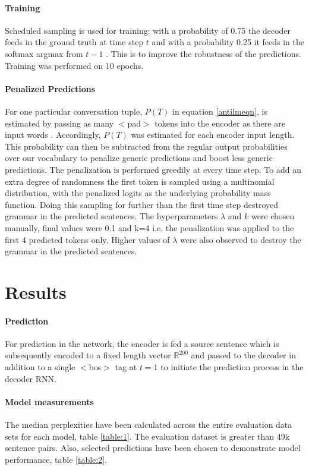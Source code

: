 \documentclass[%
 reprint,
 amsmath,amssymb,
 aps,
]{revtex4-1}
\begin{document}
\paragraph{Training} Scheduled sampling is used for training: with a probability of 0.75 the decoder feeds in the ground truth at time step $t$ and with a probability 0.25 it feeds in the softmax argmax from $t-1$ \cite{ss}. This is to improve the robustness of the predictions. Training was performed on 10 epochs.

\paragraph{Penalized Predictions}
For one particular conversation tuple, $P(T)$ in equation \ref{antilmeqn}, is estimated by passing as many $<$pad$>$ tokens into the encoder as there are input words \cite{antilmgithub}. Accordingly, $P(T)$ was estimated for each encoder input length. This probability can then be subtracted from the regular output probabilities over our vocabulary to penalize generic predictions and boost less generic predictions. The penalization is performed greedily at every time step. To add an extra degree of randomness the first token is sampled using a multinomial distribution, with the penalized logits as the underlying probability mass function. Doing this sampling for further than the first time step destroyed grammar in the predicted sentences. The hyperparameters $\lambda$ and $k$ were chosen manually, final values were 0.1 and k=4 i.e. the penalization was applied to the first 4 predicted tokens only. Higher values of $\lambda$ were also observed to destroy the grammar in the predicted sentences.

\section{\label{sec:level1}Results} \label{results}

\paragraph{Prediction}
For prediction in the network, the encoder is fed a source sentence which is subsequently encoded to a fixed length vector $\mathbb{R}^{200}$ and passed to the decoder in addition to a single $<$bos$>$ tag at $t=1$ to initiate the prediction process in the decoder RNN.

\paragraph{Model measurements}
The median perplexities have been calculated across the entire evaluation data sets for each model, table \ref{table:1}. The evaluation dataset is greater than 49k sentence pairs. Also, selected predictions have been chosen to demonstrate model performance, table \ref{table:2}.
\end{document}
